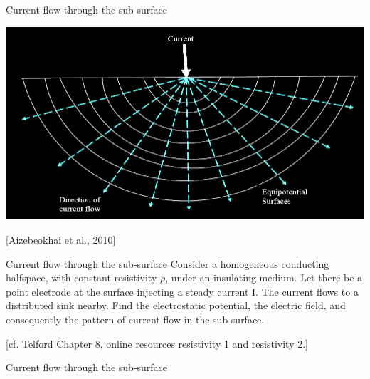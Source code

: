 \begin{frame}{Current flow through the sub-surface}
    \begin{center}
     \includegraphics[width=0.7\linewidth]{Figures/Resistivity/OneElectrodeHomoHalfspace_Aizebeokhai_SResanEss2010.png}
 
     \tiny[Aizebeokhai et al., 2010]
   \end{center}
 \end{frame}


 \begin{frame}
  \begin{PointSix}{Current flow through the sub-surface}
    \small
    Consider a homogeneous conducting halfspace, with constant resistivity $\rho$, under an insulating medium. Let there be a point electrode at the surface
injecting a steady current I. The current flows to a distributed \alert{sink nearby}. Find the electrostatic potential, the electric field, and consequently the pattern of current flow in the sub-surface.

    [cf. Telford Chapter 8, online resources resistivity 1 and resistivity 2.]
  \end{PointSix}
\end{frame}


\begin{frame}
  \begin{PointSix}{Current flow through the sub-surface}
   \begin{center}
  \end{center}
  \end{PointSix}
\end{frame}

